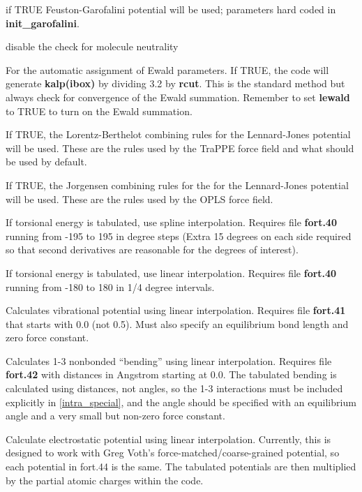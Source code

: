 \documentclass[12pt,letterpaper]{article}
\begin{document}
 if TRUE Feuston-Garofalini potential
will be used; parameters hard coded in
{\bf init\_garofalini}.

 disable the check for molecule neutrality

 For the automatic assignment
of Ewald parameters. If TRUE, the code will generate {\bf
  kalp(ibox)} by dividing 3.2 by {\bf rcut}. This is the
standard method but always check for convergence of the
Ewald summation. Remember to set {\bf lewald} to TRUE to
turn on the Ewald summation.

 If TRUE, the Lorentz-Berthelot
combining rules for the Lennard-Jones potential will be
used. These are the rules used by the TraPPE force field and
what should be used by default.

 If TRUE, the Jorgensen combining
rules for the for the Lennard-Jones potential will be used.
These are the rules used by the OPLS force field.

 If torsional energy is tabulated,
use spline interpolation. Requires file {\bf fort.40}
running from -195 to 195 in degree steps (Extra 15 degrees
on each side required so that second derivatives are
reasonable for the degrees of interest).

 If torsional energy is tabulated,
use linear interpolation. Requires file {\bf fort.40}
running from -180 to 180 in 1/4 degree intervals.

 Calculates vibrational
potential using linear interpolation. Requires file
{\bf fort.41} that starts with 0.0 (not 0.5). Must also specify
an equilibrium bond length and zero force constant.

 Calculates 1-3 nonbonded
``bending'' using linear interpolation. Requires file {\bf
  fort.42} with distances in Angstrom starting at 0.0. The
tabulated bending is calculated using distances, not angles,
so the 1-3 interactions must be included explicitly in
\ref{intra_special}, and the angle should be specified with
an equilibrium angle and a very small but non-zero force
constant.

 Calculate electrostatic
potential using linear interpolation. Currently, this is
designed to work with Greg Voth's
force-matched/coarse-grained potential, so each potential in
fort.44 is the same. The tabulated potentials are then
multiplied by the partial atomic charges within the code.
\end{document}
